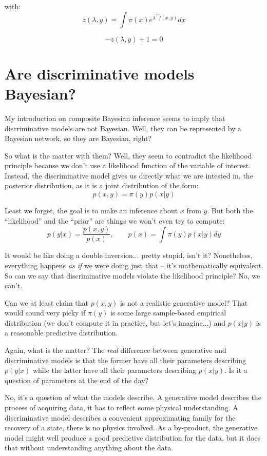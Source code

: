 \documentclass{article}
\begin{document}
with:
$$
z(\lambda,y) = \int \pi(x) e^{\lambda^\top f(x,y)} dx
$$

$$
-z(\lambda,y) + 1 =  0
$$


\section{Are discriminative models Bayesian?}

My introduction on composite Bayesian inference seems to imply that discriminative models are not Bayesian. Well, they can be represented by a Bayesian network, so they are Bayesian, right? 

So what is the matter with them? Well, they seem to contradict the likelihood principle because we don't use a likelihood function of the variable of interest. Instead, the discriminative model gives us directly what we are intested in, the posterior distribution, as it is a joint distribution of the form:
$$
p(x,y) = \pi(y) p(x|y)
$$

Least we forget, the goal is to make an inference about $x$ from $y$. But both the ``likelihood'' and the ``prior'' are things we won't even try to compute: 
$$
p(y|x) = \frac{p(x,y)}{p(x)}, 
\qquad
p(x) = \int \pi(y) p(x|y) dy
$$

It would be like doing a double inversion... pretty stupid, isn't it? Nonetheless, everything happens {\em as if} we were doing just that -- it's mathematically equivalent. So can we say that discriminative models violate the likelihood principle? No, we can't.

Can we at least claim that $p(x,y)$ is not a realistic generative model? That would sound very picky if $\pi(y)$ is some large sample-based empirical distribution (we don't compute it in practice, but let's imagine...) and $p(x|y)$ is a reasonable predictive distribution. 

Again, what is the matter? The {\em real} difference between generative and discriminative models is that the former have all their parameters describing $p(y|x)$ while the latter have all their parameters describing $p(x|y)$. Is it a question of parameters at the end of the day?

No, it's a question of what the models describe. A generative model describes the process of acquiring data, it has to reflect some physical understanding. A discriminative model describes a convenient approximating family for the recovery of a state, there is no physics involved. As a by-product, the generative model might well produce a good predictive distribution for the data, but it does that without understanding anything about the data. 
\end{document}
